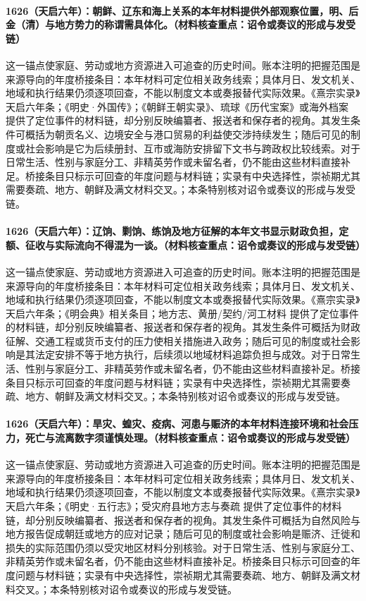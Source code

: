 \paragraph{1626（天启六年）：朝鲜、辽东和海上关系的本年材料提供外部观察位置，明、后金（清）与地方势力的称谓需具体化。（材料核查重点：诏令或奏议的形成与发受链）} 这一锚点使家庭、劳动或地方资源进入可追查的历史时间。账本注明的把握范围是来源导向的年度桥接条目：本年材料可定位相关政务线索；具体月日、发文机关、地域和执行结果仍须逐项回查，不能以制度文本或奏报替代实际效果。《熹宗实录》天启六年条；《明史·外国传》；《朝鲜王朝实录》、琉球《历代宝案》或海外档案 提供了定位事件的材料链，却分别反映编纂者、报送者和保存者的视角。其发生条件可概括为朝贡名义、边境安全与港口贸易的利益使交涉持续发生；随后可见的制度或社会影响是它为后续册封、互市或海防安排留下文书与跨政权比较线索。对于日常生活、性别与家庭分工、非精英劳作或未留名者，仍不能由这些材料直接补足。桥接条目只标示可回查的年度问题与材料链；实录有中央选择性，崇祯期尤其需要奏疏、地方、朝鲜及满文材料交叉。；本条特别核对诏令或奏议的形成与发受链。

\paragraph{1626（天启六年）：辽饷、剿饷、练饷及地方征解的本年文书显示财政负担，定额、征收与实际流向不得混为一谈。（材料核查重点：诏令或奏议的形成与发受链）} 这一锚点使家庭、劳动或地方资源进入可追查的历史时间。账本注明的把握范围是来源导向的年度桥接条目：本年材料可定位相关政务线索；具体月日、发文机关、地域和执行结果仍须逐项回查，不能以制度文本或奏报替代实际效果。《熹宗实录》天启六年条；《明会典》相关条目；地方志、黄册/契约/河工材料 提供了定位事件的材料链，却分别反映编纂者、报送者和保存者的视角。其发生条件可概括为财政征解、交通工程或货币支付的压力使相关措施进入政务；随后可见的制度或社会影响是其法定安排不等于地方执行，后续须以地域材料追踪负担与成效。对于日常生活、性别与家庭分工、非精英劳作或未留名者，仍不能由这些材料直接补足。桥接条目只标示可回查的年度问题与材料链；实录有中央选择性，崇祯期尤其需要奏疏、地方、朝鲜及满文材料交叉。；本条特别核对诏令或奏议的形成与发受链。

\paragraph{1626（天启六年）：旱灾、蝗灾、疫病、河患与赈济的本年材料连接环境和社会压力，死亡与流离数字须谨慎处理。（材料核查重点：诏令或奏议的形成与发受链）} 这一锚点使家庭、劳动或地方资源进入可追查的历史时间。账本注明的把握范围是来源导向的年度桥接条目：本年材料可定位相关政务线索；具体月日、发文机关、地域和执行结果仍须逐项回查，不能以制度文本或奏报替代实际效果。《熹宗实录》天启六年条；《明史·五行志》；受灾府县地方志与奏疏 提供了定位事件的材料链，却分别反映编纂者、报送者和保存者的视角。其发生条件可概括为自然风险与地方报告促成朝廷或地方的应对记录；随后可见的制度或社会影响是赈济、迁徙和损失的实际范围仍须以受灾地区材料分别核验。对于日常生活、性别与家庭分工、非精英劳作或未留名者，仍不能由这些材料直接补足。桥接条目只标示可回查的年度问题与材料链；实录有中央选择性，崇祯期尤其需要奏疏、地方、朝鲜及满文材料交叉。；本条特别核对诏令或奏议的形成与发受链。

